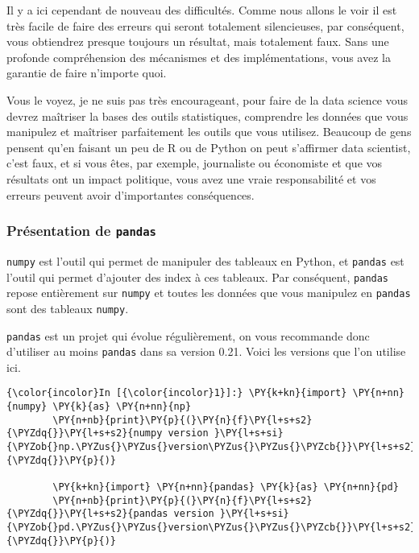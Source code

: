 Il y a ici cependant de nouveau des difficultés. Comme nous allons le
voir il est très facile de faire des erreurs qui seront totalement
silencieuses, par conséquent, vous obtiendrez presque toujours un
résultat, mais totalement faux. Sans une profonde compréhension des
mécanismes et des implémentations, vous avez la garantie de faire
n'importe quoi.

Vous le voyez, je ne suis pas très encourageant, pour faire de la data
science vous devrez maîtriser la bases des outils statistiques,
comprendre les données que vous manipulez et maîtriser parfaitement les
outils que vous utilisez. Beaucoup de gens pensent qu'en faisant un peu
de R ou de Python on peut s'affirmer data scientist, c'est faux, et si
vous êtes, par exemple, journaliste ou économiste et que vos résultats
ont un impact politique, vous avez une vraie responsabilité et vos
erreurs peuvent avoir d'importantes conséquences.

    \hypertarget{pruxe9sentation-de-pandas}{%
\subsubsection{\texorpdfstring{Présentation de
\texttt{pandas}}{Présentation de pandas}}\label{pruxe9sentation-de-pandas}}

    \texttt{numpy} est l'outil qui permet de manipuler des tableaux en
Python, et \texttt{pandas} est l'outil qui permet d'ajouter des index à
ces tableaux. Par conséquent, \texttt{pandas} repose entièrement sur
\texttt{numpy} et toutes les données que vous manipulez en
\texttt{pandas} sont des tableaux \texttt{numpy}.

\texttt{pandas} est un projet qui évolue régulièrement, on vous
recommande donc d'utiliser au moins \texttt{pandas} dans sa version
0.21. Voici les versions que l'on utilise ici.

    \begin{Verbatim}[commandchars=\\\{\}]
{\color{incolor}In [{\color{incolor}1}]:} \PY{k+kn}{import} \PY{n+nn}{numpy} \PY{k}{as} \PY{n+nn}{np}
        \PY{n+nb}{print}\PY{p}{(}\PY{n}{f}\PY{l+s+s2}{\PYZdq{}}\PY{l+s+s2}{numpy version }\PY{l+s+si}{\PYZob{}np.\PYZus{}\PYZus{}version\PYZus{}\PYZus{}\PYZcb{}}\PY{l+s+s2}{\PYZdq{}}\PY{p}{)}
        
        \PY{k+kn}{import} \PY{n+nn}{pandas} \PY{k}{as} \PY{n+nn}{pd}
        \PY{n+nb}{print}\PY{p}{(}\PY{n}{f}\PY{l+s+s2}{\PYZdq{}}\PY{l+s+s2}{pandas version }\PY{l+s+si}{\PYZob{}pd.\PYZus{}\PYZus{}version\PYZus{}\PYZus{}\PYZcb{}}\PY{l+s+s2}{\PYZdq{}}\PY{p}{)}
\end{Verbatim}


